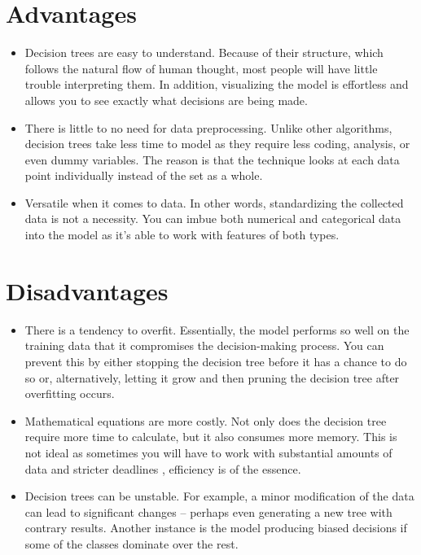 \section{Advantages}
    \begin{itemize}
        \item Decision trees are easy to understand. Because of their structure, which follows the natural flow of human thought, most people will have little trouble interpreting them. In addition, visualizing the model is effortless and allows you to see exactly what decisions are being made.
        \item There is little to no need for data preprocessing. Unlike other algorithms, decision trees take less time to model as they require less coding, analysis, or even dummy variables. The reason is that the technique looks at each data point individually instead of the set as a whole.
        \item Versatile when it comes to data. In other words, standardizing the collected data is not a necessity. You can imbue both numerical and categorical data into the model as it’s able to work with features of both types.
    \end{itemize}

\section{Disadvantages}
    \begin{itemize}
        \item There is a tendency to overfit. Essentially, the model performs so well on the training data that it compromises the decision-making process. You can prevent this by either stopping the decision tree before it has a chance to do so or, alternatively, letting it grow and then pruning the decision tree after overfitting occurs.
        \item Mathematical equations are more costly. Not only does the decision tree require more time to calculate, but it also consumes more memory. This is not ideal as sometimes you will have to work with substantial amounts of data and stricter deadlines , efficiency is of the essence.
        \item Decision trees can be unstable. For example, a minor modification of the data can lead to significant changes – perhaps even generating a new tree with contrary results. Another instance is the model producing biased decisions if some of the classes dominate over the rest.
    \end{itemize}